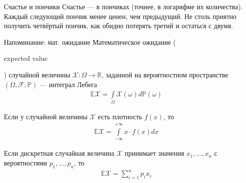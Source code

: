 \documentclass{beamer}
\newcommand{\en}[1]{\begin{otherlanguage}{english}#1\end{otherlanguage}}
\begin{document}
\begin{frame}{Счастье и пончики}
\justify
Счастье --- в пончиках (точнее, в логарифме их количества). Каждый следующий 
пончик менее ценен, чем предыдущий. Не столь приятно получить четвёртый пончик, 
как обидно потерять третий и остаться с двумя.

\justify
\centering
{}
\end{frame}



\begin{frame}{Напоминание: мат. ожидание}
\justify
Математическое ожидание (\en{expected value}) случайной величины $\mathcal{X}: 
\Omega \to \mathbb{R}$, заданной на вероятностном пространстве $(\Omega, 
\mathcal{F}, \mathbb{P})$ --- интеграл Лебега
\begin{align*}
\mathbb{E}\mathcal{X} = \int\limits_\Omega\mathcal{X}(\omega)d\mathbb{P}(\omega)
\end{align*}

\justify
Если у случайной величины $\mathcal{X}$ есть плотность $f(x)$, то
\begin{align*}
\mathbb{E}\mathcal{X} = \int\limits_{-\infty}^{+\infty}x\cdot f(x)dx
\end{align*}

\justify
Если дискретная случайная величина $\mathcal{X}$ принимает значения $x_1,...,x_n$ с вероятностями $p_1,...,p_n$, то
\begin{align*}
\mathbb{E}\mathcal{X} = \sum\limits_{i=1}^{n} p_i x_i
\end{align*}
\end{frame}
\end{document}
